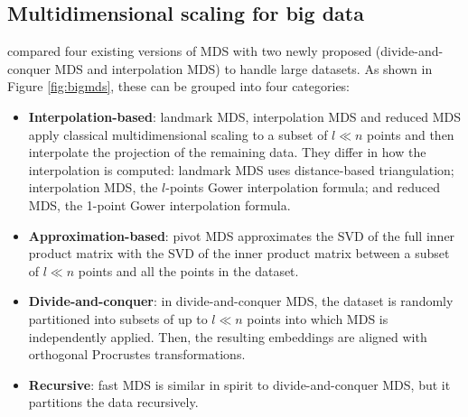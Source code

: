 \subsection{Multidimensional scaling for big data}
\label{sec:MDS-big-data}

\citet{Delicado2024} compared four existing versions of MDS with two newly proposed (divide-and-conquer MDS and interpolation MDS) to handle large datasets. As shown in Figure \ref{fig:bigmds}, these can be grouped into four categories:

\begin{itemize}
    \item \textbf{Interpolation-based}: landmark MDS, interpolation MDS and reduced MDS apply classical multidimensional scaling to a subset of $l \ll n$ points and then interpolate the projection of the remaining data. They differ in how the interpolation is computed: landmark MDS uses distance-based triangulation; interpolation MDS, the $l$-points Gower interpolation formula; and reduced MDS, the 1-point Gower interpolation formula.
    \item \textbf{Approximation-based}: pivot MDS approximates the SVD of the full inner product matrix with the SVD of the inner product matrix between a subset of $l \ll n$ points and all the points in the dataset.
    \item \textbf{Divide-and-conquer}: in divide-and-conquer MDS, the dataset is randomly partitioned into subsets of up to $l \ll n$ points into which MDS is independently applied. Then, the resulting embeddings are aligned with orthogonal Procrustes transformations.
    \item \textbf{Recursive}: fast MDS is similar in spirit to divide-and-conquer MDS, but it partitions the data recursively. 
\end{itemize}


